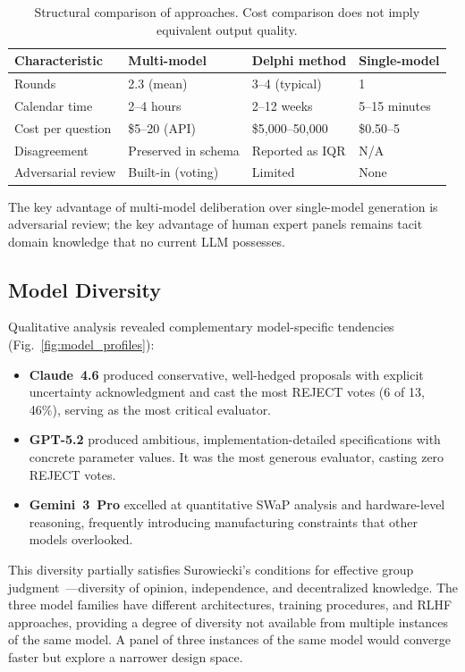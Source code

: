\documentclass[11pt,a4paper]{article}
\begin{document}
\begin{table}[ht]
\centering
\caption{Structural comparison of approaches. Cost comparison does not imply equivalent output quality.}
\label{tab:comparison}
\begin{tabular}{@{}p{2.5cm}p{3.5cm}p{3.5cm}p{3cm}@{}}
\toprule
\textbf{Characteristic} & \textbf{Multi-model} & \textbf{Delphi method} & \textbf{Single-model} \\
\midrule
Rounds & 2.3 (mean) & 3--4 (typical) & 1 \\
Calendar time & 2--4 hours & 2--12 weeks & 5--15 minutes \\
Cost per question & \$5--20 (API) & \$5{,}000--50{,}000 & \$0.50--5 \\
Disagreement & Preserved in schema & Reported as IQR & N/A \\
Adversarial review & Built-in (voting) & Limited & None \\
\bottomrule
\end{tabular}
\end{table}

The key advantage of multi-model deliberation over single-model generation is adversarial review; the key advantage of human expert panels remains tacit domain knowledge that no current LLM possesses.

\subsection{Model Diversity}

Qualitative analysis revealed complementary model-specific tendencies (Fig.~\ref{fig:model_profiles}):

\begin{itemize}[nosep]
    \item \textbf{Claude~4.6} produced conservative, well-hedged proposals with explicit uncertainty acknowledgment and cast the most REJECT votes (6 of 13, 46\%), serving as the most critical evaluator.
    \item \textbf{GPT-5.2} produced ambitious, implementation-detailed specifications with concrete parameter values. It was the most generous evaluator, casting zero REJECT votes.
    \item \textbf{Gemini~3~Pro} excelled at quantitative SWaP analysis and hardware-level reasoning, frequently introducing manufacturing constraints that other models overlooked.
\end{itemize}

This diversity partially satisfies Surowiecki's conditions for effective group judgment~\cite{surowiecki2004wisdom}---diversity of opinion, independence, and decentralized knowledge. The three model families have different architectures, training procedures, and RLHF approaches, providing a degree of diversity not available from multiple instances of the same model. A panel of three instances of the same model would converge faster but explore a narrower design space.
\end{document}
